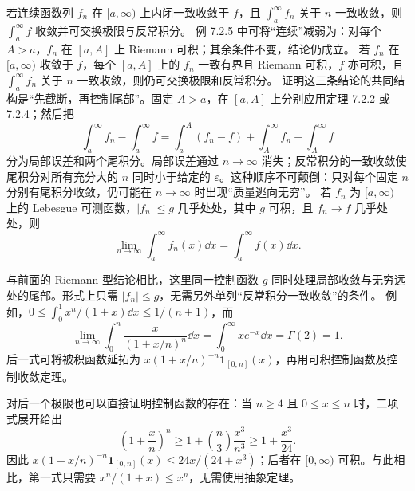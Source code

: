 若连续函数列 $f_n$ 在 $[a,\infty)$ 上内闭一致收敛于 $f$，且 $\int_a^\infty f_n$ 关于 $n$ 一致收敛，则 $\int_a^\infty f$ 收敛并可交换极限与反常积分。
例 7.2.5 中可将“连续”减弱为：对每个 $A>a$，$f_n$ 在 $[a,A]$ 上 Riemann 可积；其余条件不变，结论仍成立。
若 $f_n$ 在 $[a,\infty)$ 收敛于 $f$，每个 $[a,A]$ 上的 $f_n$ 一致有界且 Riemann 可积，$f$ 亦可积，且 $\int_a^\infty f_n$ 关于 $n$ 一致收敛，则仍可交换极限和反常积分。
\pf 证明这三条结论的共同结构是“先截断，再控制尾部”。固定 $A>a$，在 $[a,A]$ 上分别应用定理 7.2.2 或 7.2.4；然后把
\[\int_a^\infty f_n-\int_a^\infty f
=\int_a^A(f_n-f)+\int_A^\infty f_n-\int_A^\infty f\]
分为局部误差和两个尾积分。局部误差通过 $n\to\infty$ 消失；反常积分的一致收敛使尾积分对所有充分大的 $n$ 同时小于给定的 $\varepsilon$。这种顺序不可颠倒：只对每个固定 $n$ 分别有尾积分收敛，仍可能在 $n\to\infty$ 时出现“质量逃向无穷”。
若 $f_n$ 为 $[a,\infty)$ 上的 Lebesgue 可测函数，$|f_n|\le g$ 几乎处处，其中 $g$ 可积，且 $f_n\to f$ 几乎处处，则
\[\lim_{n\to\infty}\int_a^\infty f_n(x)\dd x=\int_a^\infty f(x)\dd x.\]
\par 与前面的 Riemann 型结论相比，这里同一控制函数 $g$ 同时处理局部收敛与无穷远处的尾部。形式上只需 $|f_n|\le g$，无需另外单列“反常积分一致收敛”的条件。
例如，$0\le\int_0^1 x^n/(1+x)\dd x\le1/(n+1)$，而
\[\lim_{n\to\infty}\int_0^n\frac{x}{(1+x/n)^n}\dd x
=\int_0^\infty xe^{-x}\dd x=\Gamma(2)=1.\]
后一式可将被积函数延拓为 $x(1+x/n)^{-n}\mathbf1_{[0,n]}(x)$，再用可积控制函数及控制收敛定理。
\par 对后一个极限也可以直接证明控制函数的存在：当 $n\ge4$ 且 $0\le x\le n$ 时，二项式展开给出
\[\left(1+\frac{x}{n}\right)^n\ge1+\binom n3\frac{x^3}{n^3}\ge1+\frac{x^3}{24}.\]
因此 $x(1+x/n)^{-n}\mathbf1_{[0,n]}(x)\le24x/(24+x^3)$；后者在 $[0,\infty)$ 可积。与此相比，第一式只需要 $x^n/(1+x)\le x^n$，无需使用抽象定理。

